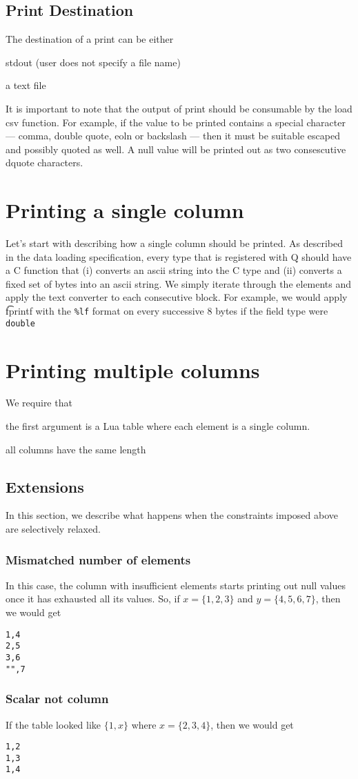 \documentclass[letterpaper]{article}
\begin{document}
\subsection{Print Destination}

The destination of a print can be either 
\be
\item stdout (user does not specify a file name)
\item a text file 
\ee

It is important to note that the output of print should be consumable by the
load csv function. For example, if the value to be printed contains a special
character --- comma, double quote, eoln or backslash --- then it must be
suitable escaped and possibly quoted as well. A null value will be printed out
as two consescutive dquote characters.

\section{Printing a single column}
\label{single_column}

Let's start with describing how a single column should be printed. As
described in the data loading specification, every type that is
registered with Q should have a C function that (i) converts an ascii
string into the C type and (ii) converts a fixed set of bytes into an ascii
string. We simply iterate through the elements and apply the text converter to
each consecutive block. For example, we would apply {\t fprintf} with the
\verb+%lf+ format on every successive 8 bytes if the field type were
{\tt double}

\section{Printing multiple columns}
\label{multiple_columns}

We require that 
\be
\item 
the first argument is a Lua table where each element is a single column. 
\item all columns have the same length
\ee

\subsection{Extensions}
In this section, we describe what happens when the constraints imposed above are
selectively relaxed.
\subsubsection{Mismatched number of elements}
In this case, the column with insufficient elements starts printing out null
values once it has exhausted all its values. So, if \(x = \{1, 2,3\}\) and \(y
= \{4, 5, 6, 7\}\), then we would get
\begin{verbatim}
1,4
2,5
3,6
"",7
\end{verbatim}

\subsubsection{Scalar not column}
If the table looked like \(\{1, x\}\) where \(x = \{2, 3, 4 \}\), then we would
get
\begin{verbatim}
1,2
1,3
1,4
\end{verbatim}
\end{document}
